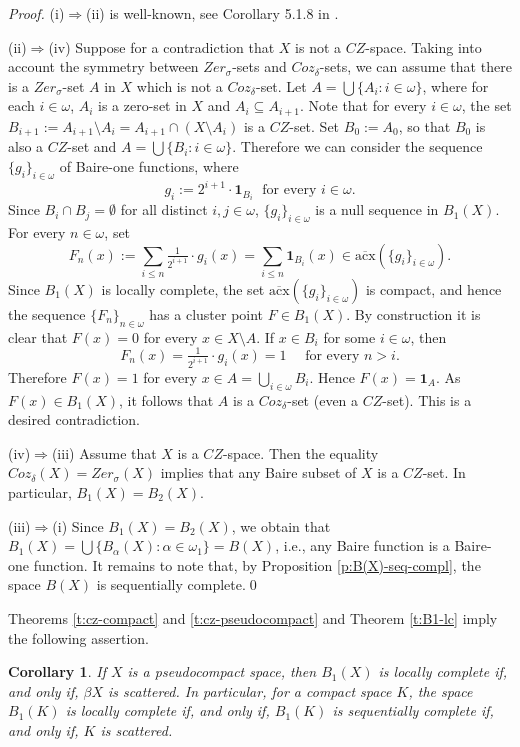\documentclass[preprint,11pt]{elsarticle}
\newtheorem{corollary}[theorem]{Corollary}
\numberwithin{equation}{section}
\numberwithin{theorem}{section}
\newcommand{\w}{\omega}
\newcommand{\cacx}{\overline{\mathrm{acx}}}
\newcommand{\SM}{{\setminus}}
\begin{document}
\begin{proof}
(i)$\Rightarrow$(ii) is well-known, see  Corollary 5.1.8 in \cite{PB}.
\smallskip


(ii)$\Rightarrow$(iv) Suppose for a contradiction that  $X$ is not a $CZ$-space. Taking into account the symmetry between  $Zer_{\sigma}$-sets and $Coz_{\delta}$-sets, we can assume that there is a $Zer_{\sigma}$-set  $A$  in $X$ which is not a $Coz_{\delta}$-set. Let $A=\bigcup\{A_i: i\in \w\}$, where  for each $i\in \w$, $A_i$ is a zero-set in $X$ and $A_i\subseteq A_{i+1}$. Note that for every $i\in\w$, the set $B_{i+1}:=A_{i+1}\setminus A_i=A_{i+1} \cap(X\SM A_i)$ is a $CZ$-set. Set $B_0:=A_0$, so that $B_0$ is also a $CZ$-set and $A=\bigcup\{B_i: i\in \w\}$. Therefore we can consider the sequence $\{g_i\}_{i\in \omega}$ of Baire-one functions, where
\[
 g_i:= 2^{i+1} \cdot \mathbf{1}_{B_i} \; \mbox{ for every $i\in\w$}.
\]
Since $B_i\cap B_j=\emptyset$ for all distinct $i,j\in\w$,  $\{g_i\}_{i\in\w}$ is a null sequence in $B_1(X)$. For every $n\in \w$, set
\[
F_n(x):=\sum\limits_{i\leq n} \tfrac{1}{2^{i+1}}\cdot g_i(x)=\sum\limits_{i\leq n} \mathbf{1}_{B_i}(x)\in \cacx(\{g_i\}_{i\in\omega}).
\]
Since $B_1(X)$ is locally complete, the set $\cacx(\{g_i\}_{i\in\omega})$ is compact, and hence the sequence $\{F_n\}_{n\in\w}$ has a cluster point $F\in B_1(X)$. By construction it is clear that $F(x)=0$ for every $x\in X\SM A$. If $x \in B_i$ for some $i\in\w$, then
\[
F_n(x)=\tfrac{1}{2^{i+1}}\cdot g_i(x) = 1 \quad \mbox{ for every $n>i$}.
\]
Therefore $F(x)=1$ for every $x\in A=\bigcup_{i\in\w} B_i$. Hence $F(x)=\mathbf{1}_A$. As $F(x)\in B_1(X)$, it follows that $A$ is a $Coz_{\delta}$-set (even a $CZ$-set). This is a desired contradiction.
\smallskip


(iv)$\Rightarrow$(iii) Assume that $X$ is a $CZ$-space. Then the equality $Coz_{\delta}(X)= Zer_{\sigma}(X)$ implies that  any Baire subset of $X$ is a $CZ$-set. In particular,  $B_1(X)=B_2(X)$.
\smallskip



(iii)$\Rightarrow$(i) Since $B_1(X)=B_2(X)$, we obtain that  $B_1(X)=\bigcup\{B_{\alpha}(X): \alpha\in \omega_1\}=B(X)$, i.e., any Baire function is a Baire-one function. It remains to note that, by Proposition \ref{p:B(X)-seq-compl}, the space $B(X)$ is sequentially complete.\qed
\end{proof}


Theorems \ref{t:cz-compact} and \ref{t:cz-pseudocompact} and Theorem \ref{t:B1-lc} imply the following assertion.
\begin{corollary} \label{c:B1-lc-pseudo}
If $X$ is a pseudocompact space, then $B_1(X)$ is locally complete if, and only if, $\beta X$ is scattered. In particular, for a compact space $K$, the space $B_1(K)$ is locally complete if, and only if, $B_1(K)$ is sequentially complete  if, and only if,  $K$ is scattered.
\end{corollary}
\end{document}
